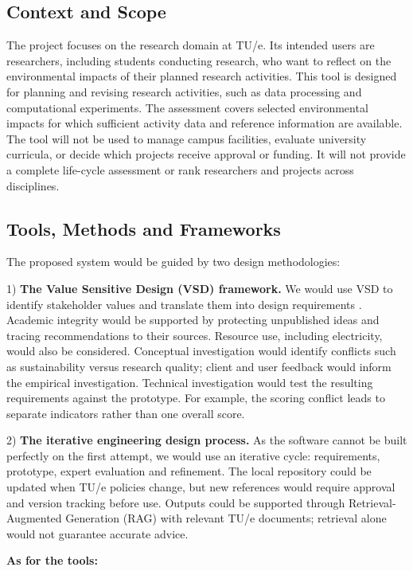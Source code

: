 \subsection{Context and Scope}

The project focuses on the research domain at TU/e. Its intended users are researchers, including students conducting research, who want to reflect on the environmental impacts of their planned research activities. This tool is designed for planning and revising research activities, such as data processing and computational experiments. The assessment covers selected environmental impacts for which sufficient activity data and reference information are available.
The tool will not be used to manage campus facilities, evaluate university curricula, or decide which projects receive approval or funding. It will not provide a complete life-cycle assessment or rank researchers and projects across disciplines.

\subsection{Tools, Methods and Frameworks}
The proposed system would be guided by two design methodologies:

1) \textbf{The Value Sensitive Design (VSD) framework.} We would use VSD to identify stakeholder values and translate them into design requirements \citep{friedman2019shaping,vsdlab}. Academic integrity would be supported by protecting unpublished ideas and tracing recommendations to their sources. Resource use, including electricity, would also be considered. Conceptual investigation would identify conflicts such as sustainability versus research quality; client and user feedback would inform the empirical investigation. Technical investigation would test the resulting requirements against the prototype. For example, the scoring conflict leads to separate indicators rather than one overall score.

2) \textbf{The iterative engineering design process.} As the software cannot be built perfectly on the first attempt, we would use an iterative cycle: requirements, prototype, expert evaluation and refinement. The local repository could be updated when TU/e policies change, but new references would require approval and version tracking before use. Outputs could be supported through Retrieval-Augmented Generation (RAG) with relevant TU/e documents; retrieval alone would not guarantee accurate advice.

\textbf{As for the tools:}

